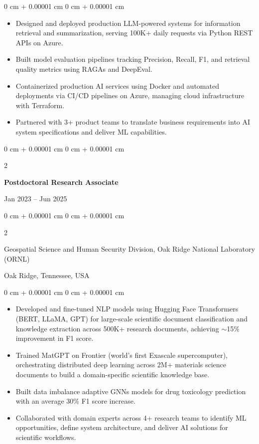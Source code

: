 \documentclass[10pt, letterpaper]{article}
\newenvironment{highlights}{
    \begin{itemize}[
        topsep=0.10 cm,
        parsep=0.10 cm,
        partopsep=0pt,
        itemsep=0pt,
        leftmargin=0 cm + 10pt
    ]
}{
    \end{itemize}
} %
\newenvironment{onecolentry}{
    \begin{adjustwidth}{
        0 cm + 0.00001 cm
    }{
        0 cm + 0.00001 cm
    }
}{
    \end{adjustwidth}
} %
\newenvironment{twocolentry}[2][]{
    \onecolentry
    \def\secondColumn{#2}
    \setcolumnwidth{\fill, 4.5 cm}
    \begin{paracol}{2}
}{
    \switchcolumn \raggedleft \secondColumn
    \end{paracol}
    \endonecolentry
} %
\begin{document}
    \begin{onecolentry}
        \begin{highlights}
            \item Designed and deployed production LLM-powered systems for information retrieval and summarization, serving 100K+ daily requests via Python REST APIs on Azure.
            \item Built model evaluation pipelines tracking Precision, Recall, F1, and retrieval quality metrics using RAGAs and DeepEval.
            \item Containerized production AI services using Docker and automated deployments via CI/CD pipelines on Azure, managing cloud infrastructure with Terraform.
            \item Partnered with 3+ product teams to translate business requirements into AI system specifications and deliver ML capabilities.
        \end{highlights}
    \end{onecolentry}

\vspace{1mm}

    \begin{twocolentry}{Jan 2023 -- Jun 2025}
        \textbf{Postdoctoral Research Associate}
    \end{twocolentry}
    \begin{twocolentry}{Oak Ridge, Tennessee, USA}
        Geospatial Science and Human Security Division, Oak Ridge National Laboratory (ORNL)
    \end{twocolentry}
    \vspace{0.10 cm}
    \begin{onecolentry}
        \begin{highlights}
            \item Developed and fine-tuned NLP models using Hugging Face Transformers (BERT, LLaMA, GPT) for large-scale scientific document classification and knowledge extraction across 500K+ research documents, achieving $\sim$15\% improvement in F1 score.
            \item Trained MatGPT on Frontier (world's first Exascale supercomputer), orchestrating distributed deep learning across 2M+ materials science documents to build a domain-specific scientific knowledge base.
            \item Built data imbalance adaptive GNNs models for drug toxicology prediction with an average 30\% F1 score increase.
            \item Collaborated with domain experts across 4+ research teams to identify ML opportunities, define system architecture, and deliver AI solutions for scientific workflows.
        \end{highlights}
    \end{onecolentry}
\end{document}
